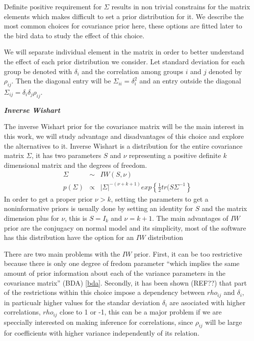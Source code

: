 \documentclass{article}
\begin{document}
Definite positive requirement for $\Sigma$ results in non trivial constrains for the matrix elements which makes difficult to set a prior distribution for it. We describe the most common choices for covariance prior here, these options are fitted later to the bird data to study the effect of this choice. 

We will separate individual element in the matrix in order to better understand the effect of each prior distribution we consider. Let standard deviation for each group be denoted with $\delta_i$ and the correlation among groups $i$ and $j$ denoted by $\rho_{ij}$. Then the diagonal entry will be $\Sigma_{ii} = \delta_i^2$ and an entry outside the diagonal $\Sigma_{ij} = \delta_i\delta_j\rho_{ij}$. 

\textbf{\emph{Inverse Wishart} }

The inverse Wishart prior for the covariance matrix will be the main interest in this work, we will study advantage and disadvantages of this choice and explore the alternatives to it. Inverse Wishart is a distribution for the entire covariance matrix $\Sigma$, it has two parameters $S$ and $\nu$ representing a positive definite $k$ dimensional matrix and the degrees of freedom. 
\begin{eqnarray}
\nonumber \Sigma &\sim& IW(S, \nu) \\
p(\Sigma) &\propto& |\Sigma|^{-(\nu + k +1)} exp\left\{ \frac{1}{2} tr(S\Sigma^{-1} \right\}
\label{eq:wis}
\end{eqnarray}
In order to get a proper prior $\nu > k$, setting the parameters to get a noninformative priors is usually done by setting an identity for $S$ and the matrix dimension plus for $\nu$, this is $S=I_k$ and $\nu=k+1$. The main advantages of $IW$ prior are the conjugacy on normal model and its simplicity, most of the software has this distribution have the option for an $IW$ distribution

There are two main problems with the $IW$ prior. First, it can be too restrictive because there is only one degree of fredom parameter ``which implies the same amount of prior information about each of the variance parameters in the covariance matrix'' (BDA) \ref{bda}. Secondly, it has been shown (REF??) that part of the restrictions within this choice impose a dependency between $rho_{ij}$ and $\delta_i$, in particualr higher values for the standar deviation $\delta_i$ are asociated with higher correlations, $rho_{ij}$ close to 1 or -1, this can be a major problem if we are speccially interested on making inference for correlations, since $\rho_{ij}$ will be large for coefficients with higher variance independently of its relation. 
\end{document}
